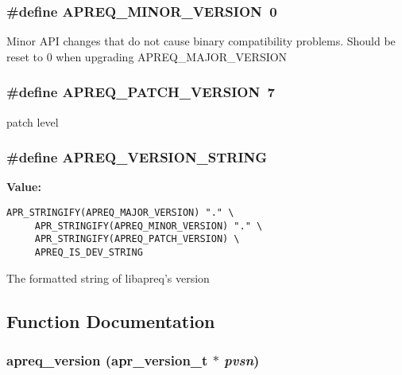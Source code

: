 \subsubsection{\setlength{\rightskip}{0pt plus 5cm}\#define APREQ\_\-MINOR\_\-VERSION\ 0}\label{apreq__version_8h_a1}


Minor API changes that do not cause binary compatibility problems. Should be reset to 0 when upgrading APREQ\_\-MAJOR\_\-VERSION 
\subsubsection{\setlength{\rightskip}{0pt plus 5cm}\#define APREQ\_\-PATCH\_\-VERSION\ 7}\label{apreq__version_8h_a2}


patch level 
\subsubsection{\setlength{\rightskip}{0pt plus 5cm}\#define APREQ\_\-VERSION\_\-STRING}\label{apreq__version_8h_a4}


{\bf Value:}

\footnotesize\begin{verbatim}APR_STRINGIFY(APREQ_MAJOR_VERSION) "." \
     APR_STRINGIFY(APREQ_MINOR_VERSION) "." \
     APR_STRINGIFY(APREQ_PATCH_VERSION) \
     APREQ_IS_DEV_STRING\end{verbatim}\normalsize 
The formatted string of libapreq's version 

\subsection{Function Documentation}
\subsubsection{ apreq\_\-version ({\bf apr\_\-version\_\-t} $\ast$ {\em pvsn})}\label{apreq__version_8h_a6}



